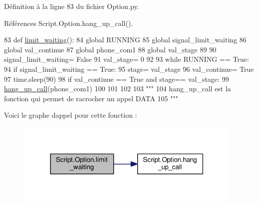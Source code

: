 Définition à la ligne 83 du fichier Option.\+py.



Références Script.\+Option.\+hang\+\_\+up\+\_\+call().


\begin{DoxyCode}
83 \textcolor{keyword}{def }\hyperlink{namespaceScript_1_1Option_a1707d1e8b288159100845df330fc8d51}{limit\_waiting}():
84     \textcolor{keyword}{global} RUNNING
85     \textcolor{keyword}{global} signal\_limit\_waiting
86     \textcolor{keyword}{global} val\_continue
87     \textcolor{keyword}{global} phone\_com1
88     \textcolor{keyword}{global} val\_stage
89 
90     signal\_limit\_waiting= \textcolor{keyword}{False}
91     val\_stage= 0
92 
93     \textcolor{keywordflow}{while} RUNNING == \textcolor{keyword}{True}:
94         \textcolor{keywordflow}{if} signal\_limit\_waiting == \textcolor{keyword}{True}:
95             stage= val\_stage
96             val\_continue= \textcolor{keyword}{True}
97             time.sleep(90)
98             \textcolor{keywordflow}{if} val\_continue == \textcolor{keyword}{True} \textcolor{keywordflow}{and} stage== val\_stage:
99                 \hyperlink{namespaceScript_1_1Option_a22c03fd81ddb28ef13f194565b4996ba}{hang\_up\_call}(phone\_com1)
100 
101 
102 
103 \textcolor{stringliteral}{"""
}
104 \textcolor{stringliteral}{hang\_up\_call est la fonction qui permet de racrocher un appel DATA
}
105 \textcolor{stringliteral}{"""}
\end{DoxyCode}
Voici le graphe d\textquotesingle{}appel pour cette fonction \+:\nopagebreak
\begin{figure}[H]
\begin{center}
\leavevmode
\includegraphics[width=309pt]{namespaceScript_1_1Option_a1707d1e8b288159100845df330fc8d51_cgraph}
\end{center}
\end{figure}
\mbox{\label{namespaceScript_1_1Option_aff91639f98fde0463987ea08e565da05}} 
